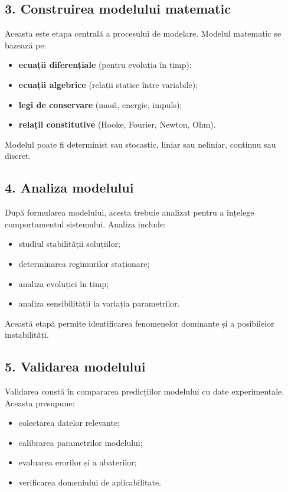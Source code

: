 \documentclass[12pt,a4paper]{article}
\begin{document}
\subsection{3. Construirea modelului matematic}

Aceasta este etapa centrală a procesului de modelare. Modelul matematic se bazează pe:
\begin{itemize}
    \item \textbf{ecuații diferențiale} (pentru evoluția în timp);
    \item \textbf{ecuații algebrice} (relații statice între variabile);
    \item \textbf{legi de conservare} (masă, energie, impuls);
    \item \textbf{relații constitutive} (Hooke, Fourier, Newton, Ohm).
\end{itemize}

Modelul poate fi determinist sau stocastic, liniar sau neliniar, continuu sau discret.

\subsection{4. Analiza modelului}

După formularea modelului, acesta trebuie analizat pentru a înțelege comportamentul sistemului. Analiza include:
\begin{itemize}
    \item studiul stabilității soluțiilor;
    \item determinarea regimurilor staționare;
    \item analiza evoluției în timp;
    \item analiza sensibilității la variația parametrilor.
\end{itemize}

Această etapă permite identificarea fenomenelor dominante și a posibilelor instabilități.

\subsection{5. Validarea modelului}

Validarea constă în compararea predicțiilor modelului cu date experimentale. Aceasta presupune:
\begin{itemize}
    \item colectarea datelor relevante;
    \item calibrarea parametrilor modelului;
    \item evaluarea erorilor și a abaterilor;
    \item verificarea domeniului de aplicabilitate.
\end{itemize}
\end{document}
